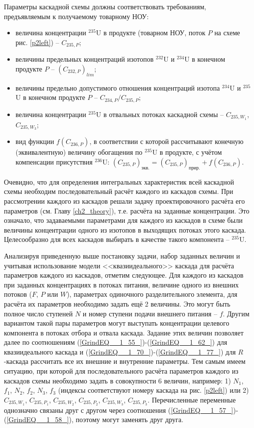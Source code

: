 Параметры каскадной схемы должны соответствовать требованиям, предъявляемым к получаемому товарному НОУ:

\begin{itemize}
    \item величина концентрации $^{235}$U в продукте (товарном НОУ, поток $P$ на схеме рис. \ref{p2left}) -- $C_{235,{P}}$;
    \item величины предельных концентраций изотопов $^{232}$U и $^{234}$U в конечном продукте $P$ -- $(C_{232,{P}})_{lim}$;
    \item величины предельно допустимого отношения концентраций изотопа $^{234}$U и $^{235}$U в конечном продукте $P$ -- ${C_{234,{P}}}/{C_{235,{P}}}$;
    \item величина концентрации $^{235}$U в отвальных потоках каскадной схемы -- $C_{235,{W_1}}$, $C_{235,{W_3}}$;
    \item вид функции $f(C_{236,P})$, в соответствии с которой рассчитывают конечную (эквивалентную) величину обогащения по $^{235}$U в продукте, с учётом компенсации присутствия $^{236}$U:
    $(C_{235,P})_\textit{экв.}=(C_{235,P})_\textit{прир.}+f(C_{236,P})$.    
\end{itemize}

Очевидно, что для определения интегральных характеристик всей каскадной схемы необходим последовательный расчёт каждого из каскадов схемы. При рассмотрении каждого из каскадов решали задачу проектировочного расчёта его параметров (см. Главу \ref{ch2_theory}), т.е. расчёта на заданные концентрации. Это означало, что задаваемыми параметрами для каждого из каскадов в схеме были величины концентрации одного из изотопов в выходящих потоках этого каскада. Целесообразно для всех каскадов выбирать в качестве такого компонента -- $^{235}$U.

Анализируя приведенную выше постановку задачи, набор заданных величин и учитывая использование модели <<квазиидеального>> каскада для расчёта параметров каждого из каскадов, отметим следующее. Для каждого из каскадов при заданных концентрациях в потоках питания, величине одного из внешних потоков ($F$, $P$ или $W$), параметрах одиночного разделительного элемента, для расчёта их параметров необходимо задать ещё 2 величины. Это могут быть полное число ступеней $N$ и номер ступени подачи внешнего питания -- $f$. Другим вариантом такой пары параметров могут выступать концентрации целевого компонента в потоках отбора и отвала каскада. Задание этих величин позволяет далее по соотношениям (\ref{GrindEQ__1_55_})-(\ref{GrindEQ__1_62_}) для квазиидеального каскада и (\ref{GrindEQ__1_70_})-(\ref{GrindEQ__1_77_}) для $R$-каскада рассчитать все их внешние и внутренние параметры. Тем самым имеем ситуацию, при которой для последовательного расчёта параметров каждого из каскадов схемы необходимо задать в совокупности 6 величин, например: 1) $N_1$, $f_1$, $N_2$, $f_2$, $N_3$, $f_3$ (индексы соответствуют номеру каскада на рис. \ref{p2left}) или 2) $C_{235,{W_1}}$, $C_{235,{P_1}}$, $C_{235,{W_2}}$, $C_{235,{P_2}}$, $C_{235,{W_3}}$, $C_{235,{P_3}}$. Перечисленные переменные однозначно связаны друг с другом через соотношения (\ref{GrindEQ__1_57_})-(\ref{GrindEQ__1_58_}), поэтому могут заменять друг друга. 

